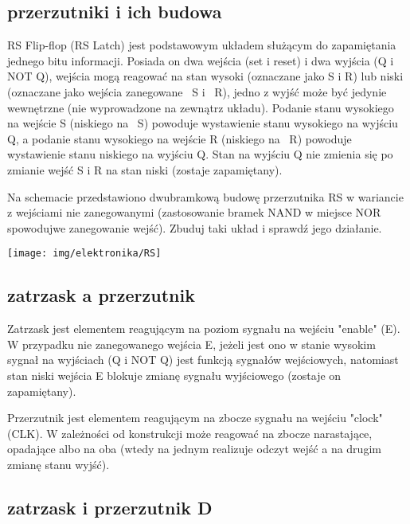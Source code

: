 \documentclass{pdfBooklets}
\begin{document}
\subsection{przerzutniki i ich budowa}

RS Flip-flop (RS Latch) jest podstawowym układem służącym do zapamiętania jednego bitu informacji. Posiada on dwa wejścia (set i reset) i dwa wyjścia (Q i NOT Q), wejścia mogą reagować na stan wysoki (oznaczane jako S i R) lub niski (oznaczane jako wejścia zanegowane ~S i ~R), jedno z wyjść może być jedynie wewnętrzne (nie wyprowadzone na zewnątrz układu). Podanie stanu wysokiego na wejście S (niskiego na ~S) powoduje wystawienie stanu wysokiego na wyjściu Q, a podanie stanu wysokiego na wejście R (niskiego na ~R) powoduje wystawienie stanu niskiego na wyjściu Q. Stan na wyjściu Q nie zmienia się po zmianie wejść S i R na stan niski (zostaje zapamiętany).

\begin{Zadanie}{}{}
\noindent\begin{minipage}[b]{0.6\textwidth}
Na schemacie przedstawiono dwubramkową budowę przerzutnika RS w wariancie z wejściami nie zanegowanymi (zastosowanie bramek NAND w miejsce NOR spowodujwe zanegowanie wejść). Zbuduj taki układ i sprawdź jego działanie.
\end{minipage}
\hfill
\begin{minipage}[b]{0.35\textwidth}
\texttt{[image: img/elektronika/RS]}
\end{minipage}
\end{Zadanie}

\subsection{zatrzask a przerzutnik}

Zatrzask jest elementem reagującym na poziom sygnału na wejściu "enable" (E). W przypadku nie zanegowanego wejścia E, jeżeli jest ono w stanie wysokim sygnał na wyjściach (Q i NOT Q) jest funkcją sygnałów wejściowych, natomiast stan niski wejścia E blokuje zmianę sygnału wyjściowego (zostaje on zapamiętany).

Przerzutnik jest elementem reagującym na zbocze sygnału na wejściu "clock" (CLK). W zależności od konstrukcji może reagować na zbocze narastające, opadające albo na oba (wtedy na jednym realizuje odczyt wejść a na drugim zmianę stanu wyjść).

\student{\clearpage}
\subsection{zatrzask i przerzutnik D}
\end{document}
